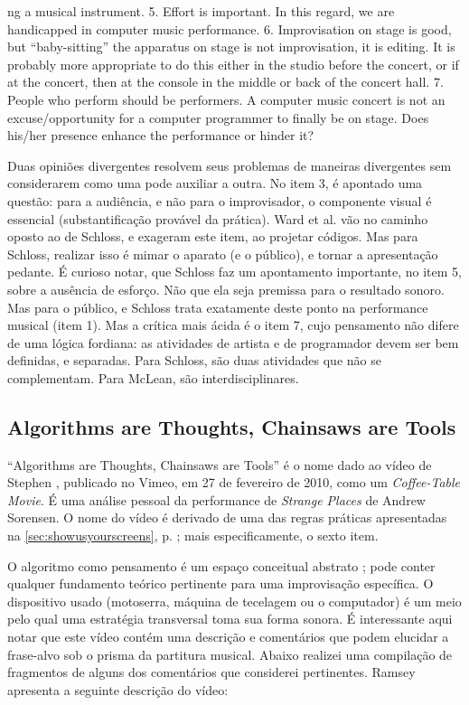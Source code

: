 \begin{citacao}
{ng a musical instrument. 5. Effort is important. In this regard, we are handicapped in computer music performance. 6. Improvisation on stage is good, but “baby-sitting” the apparatus on stage is not improvisation, it is editing. It is probably more appropriate to do this either in the studio before the concert, or if at the concert, then at the console in the middle or back of the concert hall. 7. People who perform should be performers. A computer music concert is not an excuse/opportunity for a computer programmer to finally be on stage. Does his/her presence enhance the performance or hinder it?} 
\end{citacao}

Duas opiniões divergentes resolvem seus problemas de maneiras divergentes sem considerarem como uma pode auxiliar a outra. No item 3, é apontado uma questão: para a audiência, e não para o improvisador, o componente visual é essencial (substantificação provável da prática). Ward et al. vão no caminho oposto ao de Schloss, e exageram este item, ao projetar códigos. Mas para Schloss, realizar isso é mimar o aparato (e o público), e tornar a apresentação pedante. É curioso notar, que Schloss faz um apontamento importante, no item 5, sobre a ausência de esforço. Não que ela seja premissa para o resultado sonoro. Mas para o público, e Schloss trata exatamente deste ponto na performance musical (item 1). Mas a crítica mais ácida é o item 7, cujo pensamento não difere de uma lógica fordiana: as atividades de artista e de programador devem ser bem definidas, e separadas. Para Schloss, são duas atividades que não se complementam. Para McLean, são interdisciplinares.


\subsection{Algorithms are Thoughts, Chainsaws are Tools}

``Algorithms are Thoughts, Chainsaws are Tools'' é o nome dado ao vídeo de Stephen , publicado no Vimeo, em  27 de fevereiro de 2010, como um \emph{Coffee-Table Movie}. É uma análise pessoal da performance de \emph{Strange Places} de Andrew Sorensen. O nome do vídeo é derivado de uma das regras práticas apresentadas na \autoref{sec:showusyourscreens}, p. \pageref{sec:showusyourscreens}; mais especificamente, o sexto item.

O algoritmo como pensamento é um espaço conceitual abstrato ; pode conter qualquer fundamento teórico pertinente para uma improvisação específica. O dispositivo usado (motoserra, máquina de tecelagem ou o computador) é um meio pelo qual uma estratégia transversal  toma sua forma sonora. É interessante aqui notar que este vídeo contém uma descrição e comentários que podem elucidar a frase-alvo sob o prisma da partitura musical. Abaixo realizei uma compilação de fragmentos de alguns dos comentários que considerei pertinentes. Ramsey apresenta a seguinte descrição do vídeo:

